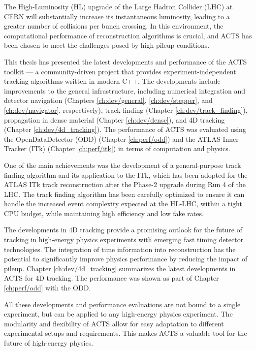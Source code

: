 The High-Luminosity (HL) upgrade \cite{hl-lhc-tdr} of the Large Hadron Collider (LHC) at CERN will substantially increase its instantaneous luminosity, leading to a greater number of collisions per bunch crossing. In this environment, the computational performance of reconstruction algorithms is crucial, and ACTS has been chosen to meet the challenges posed by high-pileup conditions.

This thesis has presented the latest developments and performance of the ACTS toolkit \cite{acts-2022} --- a community-driven project that provides experiment-independent tracking algorithms written in modern C++. The developments include improvements to the general infrastructure, including numerical integration and detector navigation (Chapters \ref{ch:dev/general}, \ref{ch:dev/stepper}, and \ref{ch:dev/navigator}, respectively), track finding (Chapter \ref{ch:dev/track_finding}), propagation in dense material (Chapter \ref{ch:dev/dense}), and 4D tracking (Chapter \ref{ch:dev/4d_tracking}). The performance of ACTS was evaluated using the OpenDataDetector (ODD) \cite{odd-v2} (Chapter \ref{ch:perf/odd}) and the ATLAS \cite{atlas} Inner Tracker (ITk) \cite{itk-pixel-tdr}\cite{itk-strip-tdr} (Chapter \ref{ch:perf/itk}) in terms of computation and physics.

One of the main achievements was the development of a general-purpose track finding algorithm and its application to the ITk, which has been adopted for the ATLAS ITk track reconstruction after the Phase-2 upgrade during Run 4 of the LHC. The track finding algorithm has been carefully optimized to ensure it can handle the increased event complexity expected at the HL-LHC, within a tight CPU budget, while maintaining high efficiency and low fake rates.

The developments in 4D tracking provide a promising outlook for the future of tracking in high-energy physics experiments with emerging fast timing detector technologies. The integration of time information into reconstruction has the potential to significantly improve physics performance by reducing the impact of pileup. Chapter \ref{ch:dev/4d_tracking} summarizes the latest developments in ACTS for 4D tracking. The performance was shown as part of Chapter \ref{ch:perf/odd} with the ODD.

All these developments and performance evaluations are not bound to a single experiment, but can be applied to any high-energy physics experiment. The modularity and flexibility of ACTS allow for easy adaptation to different experimental setups and requirements. This makes ACTS a valuable tool for the future of high-energy physics.
